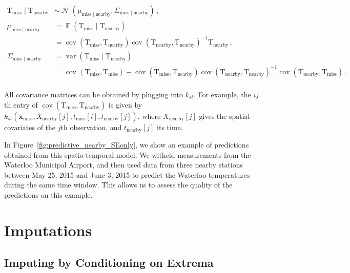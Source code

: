 \documentclass[letter]{article}
\newcommand{\genericdel}[3]{%
      \left#1#3\right#2
    }
\newcommand{\del}[1]{\genericdel(){#1}}
\newcommand{\sbr}[1]{\genericdel[]{#1}}
\DeclareMathOperator{\E}{\mathbb{E}}
\DeclareMathOperator{\cov}{{cov}}
\DeclareMathOperator{\var}{{var}}
\DeclareMathOperator{\normal}{\mathcal{N}}
\newcommand{\T}{\mathrm{T}}
\newcommand{\xvec}{\mathbold{x}}
\newcommand{\miss}{\mathrm{miss}}
\newcommand{\obs}{\mathrm{nearby}}
\newcommand{\eqlabel}[1]{\label{#1}}
\begin{document}
\begin{equation}
\eqlabel{eq:unconstrained_post}
\begin{split}
    \T_\miss \mid \T_\obs &\sim \normal\del{\mu_{\miss \mid \obs}, \Sigma_{\miss \mid \obs}}\,, \\
    \mu_{\miss \mid \obs} &= \E \del{\T_\miss \mid \T_\obs} \\
        &= \cov\del{\T_\miss, \T_\obs} \cov\del{\T_\obs, \T_\obs}^{-1} \T_\obs\,, \\
    \Sigma_{\miss \mid \obs} &= \var \del{\T_\miss \mid \T_\obs} \\
        &= \cov\del{\T_\miss,\T_\miss} - \cov\del{\T_\miss, \T_\obs} \cov\del{\T_\obs, \T_\obs}^{-1} \cov\del{\T_\obs, \T_\miss}\,. \\ %
\end{split}
\end{equation}

All covariance matrices can be obtained by plugging into \(k_{st}\). For example, the \(ij\)th entry of \(\cov\del{\T_\miss, \T_\obs}\) is given by \(k_{st}(\xvec_\miss,X_\obs\sbr{j},t_\miss\sbr{i},t_\obs\sbr{j})\), where \(X_\obs\sbr{j}\) gives the spatial covariates of the \(j\)th observation, and \(t_\obs\sbr{j}\) its time.

In Figure~\ref{fig:predictive_nearby_SEonly}, we show an example of predictions obtained from this spatio-temporal model. We witheld measurements from the Waterloo Municipal Airport, and then used data from three nearby stations between May 25, 2015 and June 3, 2015 to predict the Waterloo temperatures during the same time window. This allows us to assess the quality of the predictions on this example.
    


        \section{Imputations}\label{imputations}

\subsection{Imputing by Conditioning on Extrema}\label{imputing-by-conditioning-on-extrema}
    
\end{document}
